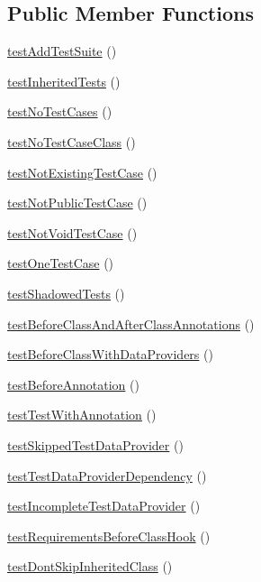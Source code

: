 \subsection*{Public Member Functions}
\begin{DoxyCompactItemize}
\item 
\mbox{\hyperlink{class_framework___suite_test_a0f6234929d2f6d96c4aba566a83e7fc5}{test\+Add\+Test\+Suite}} ()
\item 
\mbox{\hyperlink{class_framework___suite_test_a9cb7c7f187a7fb16b68fcbcbe4b48edc}{test\+Inherited\+Tests}} ()
\item 
\mbox{\hyperlink{class_framework___suite_test_aaf742b350508b323d809c08167cc03b1}{test\+No\+Test\+Cases}} ()
\item 
\mbox{\hyperlink{class_framework___suite_test_a9d45274576f79480f27bac5c6b4d9ccc}{test\+No\+Test\+Case\+Class}} ()
\item 
\mbox{\hyperlink{class_framework___suite_test_a4501ffbd1b4f19c005052f2092d3ea98}{test\+Not\+Existing\+Test\+Case}} ()
\item 
\mbox{\hyperlink{class_framework___suite_test_ac6108ab662ce3ec05f51c9f21fc55326}{test\+Not\+Public\+Test\+Case}} ()
\item 
\mbox{\hyperlink{class_framework___suite_test_ae5f75f68d9beb2d77be5c695fd543a41}{test\+Not\+Void\+Test\+Case}} ()
\item 
\mbox{\hyperlink{class_framework___suite_test_abd534170fe200a3e976884434f8100fc}{test\+One\+Test\+Case}} ()
\item 
\mbox{\hyperlink{class_framework___suite_test_a9bd958cb0e3caaebf7229d328507f319}{test\+Shadowed\+Tests}} ()
\item 
\mbox{\hyperlink{class_framework___suite_test_a9cf3fa9890fd815918942b5e15db85a0}{test\+Before\+Class\+And\+After\+Class\+Annotations}} ()
\item 
\mbox{\hyperlink{class_framework___suite_test_a9755be1e6e5022f31be635d2bae10534}{test\+Before\+Class\+With\+Data\+Providers}} ()
\item 
\mbox{\hyperlink{class_framework___suite_test_a5c5cee430619116d4ff035e534d5ad3b}{test\+Before\+Annotation}} ()
\item 
\mbox{\hyperlink{class_framework___suite_test_aa5d90023f5a867393959399db3522bb0}{test\+Test\+With\+Annotation}} ()
\item 
\mbox{\hyperlink{class_framework___suite_test_ada3b6d4cb773c1ad6dcc260fae5f4ad4}{test\+Skipped\+Test\+Data\+Provider}} ()
\item 
\mbox{\hyperlink{class_framework___suite_test_a358b3f92bd4ea3a968082c14cdd09a85}{test\+Test\+Data\+Provider\+Dependency}} ()
\item 
\mbox{\hyperlink{class_framework___suite_test_aa2946201a2527a97beeeed55d2424b0e}{test\+Incomplete\+Test\+Data\+Provider}} ()
\item 
\mbox{\hyperlink{class_framework___suite_test_a18caf38e41d024db98723de215b3726a}{test\+Requirements\+Before\+Class\+Hook}} ()
\item 
\mbox{\hyperlink{class_framework___suite_test_a0a0b02a23be0eca903b59ad852106f47}{test\+Dont\+Skip\+Inherited\+Class}} ()
\end{DoxyCompactItemize}
